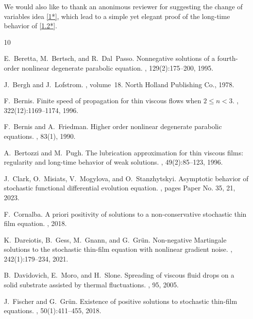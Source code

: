 \documentclass[a4paper,12pt]{article}
\numberwithin{equation}{section}
\begin{document}
We would also like to thank an anonimous reviewer for suggesting the change of variables idea \eqref{1*}, which lead to a simple yet elegant proof of the long-time behavior of \eqref{1.2*}.



\begin{thebibliography}{10}

E.~Beretta, M.~Bertsch, and R.~Dal~Passo.
\newblock Nonnegative solutions of a fourth-order nonlinear degenerate
  parabolic equation.
, 129(2):175--200, 1995.

J.~Bergh and J.~Lofstrom.
, volume~18.
\newblock North Holland Publishing Co., 1978.

F.~Bernis.
\newblock Finite speed of propagation for thin viscous flows when $2 \leq n < 3$.
, 322(12):1169--1174,
  1996.

F.~Bernis and A.~Friedman.
\newblock Higher order nonlinear degenerate parabolic equations.
, 83(1), 1990.

A.~Bertozzi and M.~Pugh.
\newblock The lubrication approximation for thin viscous films: regularity and
  long-time behavior of weak solutions.
, 49(2):85--123, 1996.

J.~Clark, O.~Misiats, V.~Mogylova, and O.~Stanzhytskyi.
\newblock Asymptotic behavior of stochastic functional differential evolution
  equation.
, pages Paper No. 35, 21,
  2023.

F.~Cornalba.
\newblock A priori positivity of solutions to a non-conservative stochastic
  thin film equation.
, 2018.

K.~Dareiotis, B.~Gess, M.~Gnann, and G.~Gr\"{u}n.
\newblock Non-negative {M}artingale solutions to the stochastic thin-film
  equation with nonlinear gradient noise.
, 242(1):179--234, 2021.

B.~Davidovich, E.~Moro, and H.~Slone.
\newblock Spreading of viscous fluid drops on a solid substrate assisted by
  thermal fluctuations.
, 95, 2005.

J.~Fischer and G.~Gr\"{u}n.
\newblock Existence of positive solutions to stochastic thin-film equations.
, 50(1):411--455, 2018.


\end{thebibliography}
\end{document}
